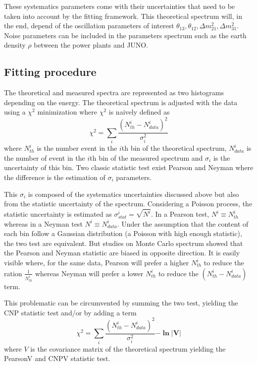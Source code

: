 These systematics parameters come with their uncertainties that need to be taken into account by the fitting framework. This theoretical spectrum will, in the end, depend of the oscillation parameters of interest $\theta_{13}, \theta_{12}, \Delta m^2_{21}, \Delta m^2_{31}$. Noise parameters can be included in the parameters spectrum such as the earth density $\rho$ between the power plants and JUNO.

\subsection{Fitting procedure}

The theoretical and measured spectra are represented as two histograms depending on the energy. The theoretical spectrum is adjusted with the data using a $\chi^2$ minimization where $\chi^2$ is naively defined as
\begin{equation}
  \chi^2 = \sum_i \frac{(N^i_{th} - N^i_{data})^2}{\sigma_i^2}
\end{equation}
where $N^i_{th}$ is the number event in the $i$th bin of the theoretical spectrum, $N^i_{data}$ is the number of event in the $i$th bin of the measured spectrum and $\sigma_i$ is the uncertainty of this bin. Two classic statistic test exist Pearson and Neyman where the difference is the estimation of $\sigma_i$ parameters.

This $\sigma_i$ is composed of the systematics uncertainties discussed above but also from the statistic uncertainty of the spectrum. Considering a Poisson process, the statistic uncertainty is estimated as $\sigma_{stat}^i = \sqrt{N^i}$. In a Pearson test, $N^i \equiv N^i_{th}$ whereas in a Neyman test $N^i \equiv N^i_{data}$. Under the assumption that the content of each bin follow a Gaussian distribution (a Poisson with high enough statistic), the two test are equivalent. But studies on Monte Carlo spectrum showed that the Pearson and Neyman statistic are biased in opposite direction. It is easily visible where, for the same data, Pearson will prefer a higher $N^i_{th}$ to reduce the ration $\frac{1}{N^i_{th}}$ whereas Neyman will prefer a lower $N^i_{th}$ to reduce the $(N^i_{th} - N^i_{data})$ term.

This problematic can be circumvented by summing the two test, yielding the CNP statistic test and/or by adding a term
\begin{equation}
  \chi^2 = \sum_i \frac{(N^i_{th} - N^i_{data})^2}{\sigma_i^2} \mathbf{- \ln |V|}
\end{equation}
where $V$ is the covariance matrix of the theoretical spectrum yielding the PearsonV and CNPV statistic test.


